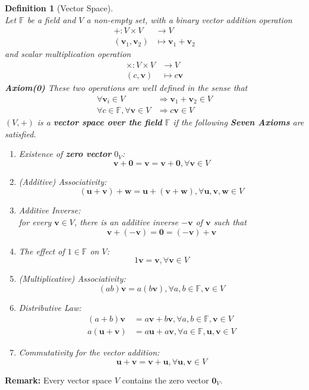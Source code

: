 \documentclass[12pt]{article}
\newtheorem{definition}{Definition}[section]
\theoremstyle{definition}
\begin{document}
\begin{definition}[Vector Space]
\hfill\\
\normalfont Let $\mathbb{F}$ be a field and $V$ a non-empty set, with a binary vector addition operation
\[
\begin{aligned}
+ : V\times V&\to V\\
(\mathbf{v}_1,\mathbf{v}_2)&\mapsto \mathbf{v}_1+\mathbf{v}_2
\end{aligned}
\]
and scalar multiplication operation
\[
\begin{aligned}
\times : V\times V&\to V\\
(c,\mathbf{v})&\mapsto c\mathbf{v}
\end{aligned}
\]
\textbf{Axiom(0)} These two operations are well defined in the sense that
\[
\begin{aligned}
\forall \mathbf{v}_i\in V&\Rightarrow \mathbf{v}_1+\mathbf{v}_2\in V\\
\forall c\in\mathbb{F}, \forall \mathbf{v}\in V&\Rightarrow c\mathbf{v}\in V
\end{aligned}
\]
$(V,+)$ is a \textbf{vector space over the field} $\mathbb{F}$ if the following \textbf{Seven Axioms} are satisfied.
\begin{enumerate}[label=(\arabic*)]
\item Existence of \textbf{zero vector} $0_V$:
\[
\mathbf{v}+\mathbf{0}=\mathbf{v}=\mathbf{v}+\mathbf{0}, \forall \mathbf{v}\in V
\]
\item (Additive) Associativity:
\[
(\mathbf{u}+\mathbf{v})+\mathbf{w}= \mathbf{u}+(\mathbf{v}+\mathbf{w}), \forall \mathbf{u},\mathbf{v},\mathbf{w}\in V
\]
\item Additive Inverse:\\for every $\mathbf{v}\in V$, there is an additive inverse $-\mathbf{v}$ of $\mathbf{v}$ such that
\[
\mathbf{v}+(-\mathbf{v})=\mathbf{0}=(-\mathbf{v})+\mathbf{v}
\]
\item The effect of $1\in \mathbb{F}$ on $V$:
\[
1\mathbf{v}=\mathbf{v}, \forall \mathbf{v}\in V
\]
\item (Multiplicative) Associativity:
\[
(ab)\mathbf{v}=a(b\mathbf{v}),\forall a,b\in \mathbb{F},\mathbf{v}\in V
\]
\item Distributive Law:
\[
\begin{aligned}
(a+b)\mathbf{v}&=a\mathbf{v}+b\mathbf{v},\forall a,b\in \mathbb{F}, \mathbf{v}\in V\\
a(\mathbf{u}+\mathbf{v})&=a\mathbf{u}+a\mathbf{v}, \forall a\in \mathbb{F}, \mathbf{u},\mathbf{v}\in V
\end{aligned}
\]
\item Commutativity for the vector addition:
\[
\mathbf{u}+\mathbf{v}=\mathbf{v}+\mathbf{u}, \forall \mathbf{u},\mathbf{v}\in V
\]
\end{enumerate}
\end{definition}
\textbf{Remark:} Every vector space $V$ contains the zero vector $\mathbf{0}_V$.
\clearpage
\end{document}

